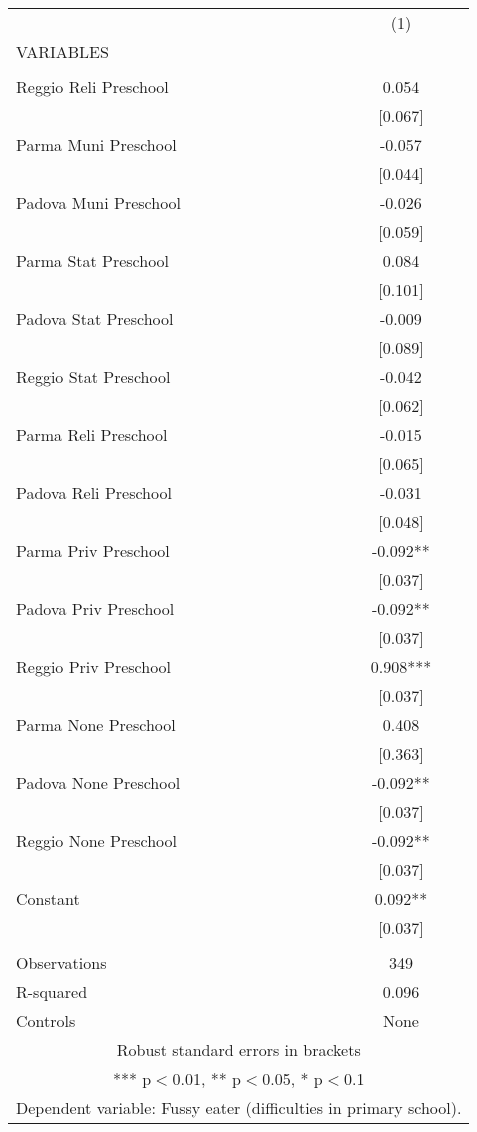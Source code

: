 \begin{tabular}{lc} \hline
 & (1) \\
VARIABLES &  \\ \hline
 &  \\
Reggio Reli Preschool & 0.054 \\
 & [0.067] \\
Parma Muni Preschool & -0.057 \\
 & [0.044] \\
Padova Muni Preschool & -0.026 \\
 & [0.059] \\
Parma Stat Preschool & 0.084 \\
 & [0.101] \\
Padova Stat Preschool & -0.009 \\
 & [0.089] \\
Reggio Stat Preschool & -0.042 \\
 & [0.062] \\
Parma Reli Preschool & -0.015 \\
 & [0.065] \\
Padova Reli Preschool & -0.031 \\
 & [0.048] \\
Parma Priv Preschool & -0.092** \\
 & [0.037] \\
Padova Priv Preschool & -0.092** \\
 & [0.037] \\
Reggio Priv Preschool & 0.908*** \\
 & [0.037] \\
Parma None Preschool & 0.408 \\
 & [0.363] \\
Padova None Preschool & -0.092** \\
 & [0.037] \\
Reggio None Preschool & -0.092** \\
 & [0.037] \\
Constant & 0.092** \\
 & [0.037] \\
 &  \\
Observations & 349 \\
R-squared & 0.096 \\
 Controls & None \\ \hline
\multicolumn{2}{c}{ Robust standard errors in brackets} \\
\multicolumn{2}{c}{ *** p$<$0.01, ** p$<$0.05, * p$<$0.1} \\
\multicolumn{2}{c}{ Dependent variable: Fussy eater (difficulties in primary school).} \\
\end{tabular}

